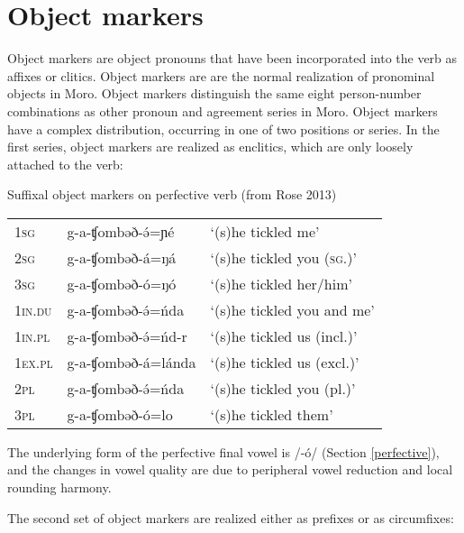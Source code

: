 
\section{Object markers}\label{sec:ch7:om}

Object markers are object pronouns that have been incorporated into the verb as affixes or clitics. Object markers are are the normal realization of pronominal objects in Moro. Object markers distinguish the same eight person-number combinations as other pronoun and agreement series in Moro. Object markers have a complex distribution, occurring in one of two positions or series. In the first series, object markers are realized as enclitics, which are only loosely attached to the verb:

\ea Suffixal object markers on perfective verb (from Rose 2013)\\
\begin{tabular}[t]{lll}
1\textsc{sg} & g-a-ʧombəð-ə́=ɲé	& `(s)he tickled me'\\ 
2\textsc{sg} & g-a-ʧombəð-á=ŋá & `(s)he tickled you (\textsc{sg}.)'\\
3\textsc{sg} & g-a-ʧombəð-ó=ŋó & `(s)he tickled her/him'\\
1\textsc{in}.\textsc{du} & g-a-ʧombəð-ə́=ńda & `(s)he tickled you and me'\\
1\textsc{in}.\textsc{pl} & g-a-ʧombəð-ə́=ńd-r & `(s)he tickled us (incl.)'\\
1\textsc{ex}.\textsc{pl} & g-a-ʧombəð-á=lánda& `(s)he tickled us (excl.)'\\
2\textsc{pl} &  g-a-ʧombəð-ə́=ńda & `(s)he tickled you (pl.)'\\
3\textsc{pl} &  g-a-ʧombəð-ó=lo & `(s)he tickled them'\\
\end{tabular} \label{ex:ch7:pfvom}
\z

The underlying form of the perfective final vowel is /-ó/ (Section \ref{perfective}), and the changes in vowel quality are due to peripheral vowel reduction and local rounding harmony.

The second set of object markers are realized either as prefixes or as circumfixes:

